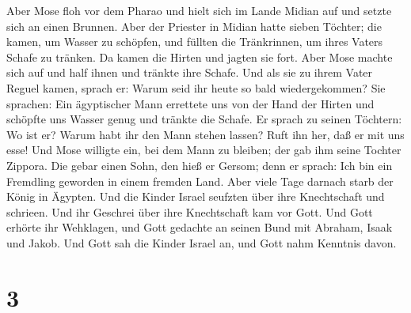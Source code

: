 Aber Mose floh vor dem Pharao und hielt sich im Lande Midian auf und
setzte sich an einen Brunnen.  Aber der Priester in
Midian hatte sieben Töchter; die kamen, um Wasser zu schöpfen, und
füllten die Tränkrinnen, um ihres Vaters Schafe zu tränken.
 Da kamen die Hirten und jagten sie fort. Aber Mose
machte sich auf und half ihnen und tränkte ihre Schafe. 
Und als sie zu ihrem Vater Reguel kamen, sprach er: Warum seid ihr heute
so bald wiedergekommen?  Sie sprachen: Ein ägyptischer
Mann errettete uns von der Hand der Hirten und schöpfte uns Wasser genug
und tränkte die Schafe.  Er sprach zu seinen Töchtern: Wo
ist er? Warum habt ihr den Mann stehen lassen? Ruft ihn her, daß er mit
uns esse!  Und Mose willigte ein, bei dem Mann zu
bleiben; der gab ihm seine Tochter Zippora.  Die gebar
einen Sohn, den hieß er Gersom; denn er sprach: Ich bin ein Fremdling
geworden in einem fremden Land.  Aber viele Tage darnach
starb der König in Ägypten. Und die Kinder Israel seufzten über ihre
Knechtschaft und schrieen. Und ihr Geschrei über ihre Knechtschaft kam
vor Gott.  Und Gott erhörte ihr Wehklagen, und Gott
gedachte an seinen Bund mit Abraham, Isaak und Jakob. 
Und Gott sah die Kinder Israel an, und Gott nahm Kenntnis davon.

\hypertarget{section-2}{%
\section{3}\label{section-2}}

